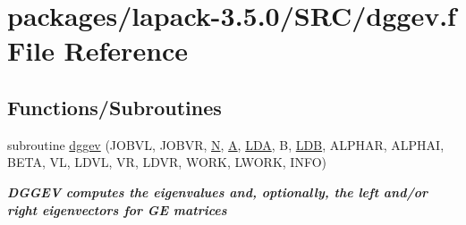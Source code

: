 \hypertarget{dggev_8f}{}\section{packages/lapack-\/3.5.0/\+S\+R\+C/dggev.f File Reference}
\label{dggev_8f}
\subsection*{Functions/\+Subroutines}
\begin{DoxyCompactItemize}
\item 
subroutine \hyperlink{group__doubleGEeigen_ga4f59e87e670a755b41cbdd7e97f36bea}{dggev} (J\+O\+B\+V\+L, J\+O\+B\+V\+R, \hyperlink{polmisc_8c_a0240ac851181b84ac374872dc5434ee4}{N}, \hyperlink{classA}{A}, \hyperlink{example__user_8c_ae946da542ce0db94dced19b2ecefd1aa}{L\+D\+A}, B, \hyperlink{example__user_8c_a50e90a7104df172b5a89a06c47fcca04}{L\+D\+B}, A\+L\+P\+H\+A\+R, A\+L\+P\+H\+A\+I, B\+E\+T\+A, V\+L, L\+D\+V\+L, V\+R, L\+D\+V\+R, W\+O\+R\+K, L\+W\+O\+R\+K, I\+N\+F\+O)
\begin{DoxyCompactList}\small\item\em {\bfseries  D\+G\+G\+E\+V computes the eigenvalues and, optionally, the left and/or right eigenvectors for G\+E matrices} \end{DoxyCompactList}\end{DoxyCompactItemize}
